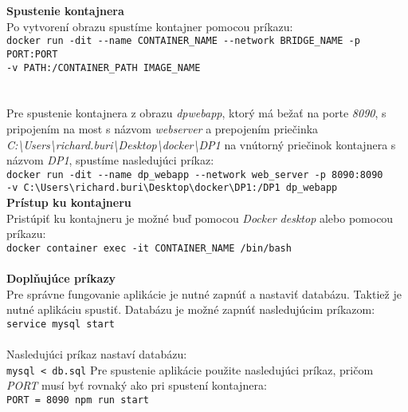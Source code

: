 \textbf{Spustenie kontajnera}\\
Po vytvorení obrazu spustíme kontajner pomocou príkazu: \\
\indent \verb|docker run -dit --name CONTAINER_NAME --network BRIDGE_NAME -p PORT:PORT|\\
\indent \verb|-v PATH:/CONTAINER_PATH IMAGE_NAME| \\\\ \pagebreak \\
Pre spustenie kontajnera z obrazu \textit{dp\textunderscore webapp}, ktorý má bežať na porte \textit{8090}, s pripojením na most s názvom \textit{web\textunderscore server} a prepojením priečinka \textit{C:\textbackslash Users\textbackslash richard.buri\textbackslash Desktop\textbackslash docker\textbackslash DP1} na vnútorný priečinok kontajnera s názvom \textit{DP1}, spustíme nasledujúci príkaz: \\
\indent \verb|docker run -dit --name dp_webapp --network web_server -p 8090:8090| \\
\indent \verb|-v C:\Users\richard.buri\Desktop\docker\DP1:/DP1 dp_webapp|\\

\textbf{Prístup ku kontajneru}\\
Pristúpiť ku kontajneru je možné buď pomocou \textit{Docker desktop} alebo pomocou príkazu:\\
\indent \verb|docker container exec -it CONTAINER_NAME /bin/bash|\\\\

\textbf{Doplňujúce príkazy}\\
Pre správne fungovanie aplikácie je nutné zapnúť a nastaviť databázu. Taktiež je nutné aplikáciu spustiť. Databázu je možné zapnúť nasledujúcim príkazom:\\
\indent \verb|service mysql start|\\\\
Nasledujúci príkaz nastaví databázu:\\
\indent \verb|mysql < db.sql|
Pre spustenie aplikácie použite nasledujúci príkaz, pričom \textit{PORT} musí byť rovnaký ako pri spustení kontajnera:\\
\indent \verb|PORT = 8090 npm run start|

